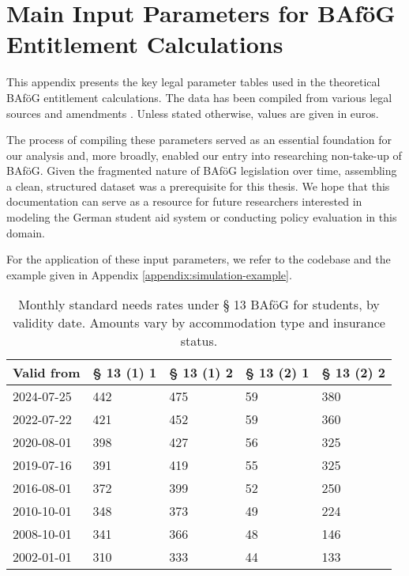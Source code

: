\newpage
\section{Main Input Parameters for BAföG Entitlement Calculations} \label{appendix:input_params}

This appendix presents the key legal parameter tables used in the theoretical BAföG entitlement calculations. 
The data has been compiled from various legal sources and amendments \cite{bafoeg_law, bafoeg20, bafoeg21, bafoeg22, bafoeg23, bafoeg24, bafoeg25, bafoeg26, bafoeg27, bafoeg28}. 
Unless stated otherwise, values are given in euros.

The process of compiling these parameters served as an essential foundation for our analysis and, more broadly, enabled our entry into researching non-take-up of BAföG. 
Given the fragmented nature of BAföG legislation over time, assembling a clean, structured dataset was a prerequisite for this thesis.
We hope that this documentation can serve as a resource for future researchers interested in modeling the German student aid system or conducting policy evaluation in this domain.

For the application of these input parameters, we refer to the codebase \citep[][version~\texttt{v1.0}]{bystrom2025msc} and the example given in Appendix \ref{appendix:simulation-example}.
\vspace{1em}

\begin{table}[H]
\centering
\small
\begin{tabularx}{\textwidth}{lXXXX}
\toprule
\textbf{Valid from} & \textbf{§ 13 (1) 1} & \textbf{§ 13 (1) 2} & \textbf{§ 13 (2) 1} & \textbf{§ 13 (2) 2} \\
\midrule
2024-07-25 & 442 & 475 & 59 & 380 \\
2022-07-22 & 421 & 452 & 59 & 360 \\
2020-08-01 & 398 & 427 & 56 & 325 \\
2019-07-16 & 391 & 419 & 55 & 325 \\
2016-08-01 & 372 & 399 & 52 & 250 \\
2010-10-01 & 348 & 373 & 49 & 224 \\
2008-10-01 & 341 & 366 & 48 & 146 \\
2002-01-01 & 310 & 333 & 44 & 133 \\
\bottomrule
\end{tabularx}
\caption{Monthly standard needs rates under § 13 BAföG for students, by validity date. Amounts vary by accommodation type and insurance status.}
\label{tab:bafog_values_13}
\end{table}

